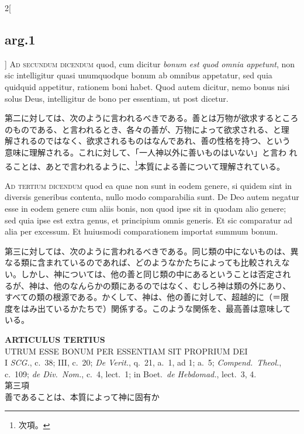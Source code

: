 \documentclass[paper=a4paper,fontsize=10pt,jafontsize=9pt,titlepage]{jlreq}
\begin{document}
\begin{paracol}{2}[\subsection{arg.1}]
{\scshape Ad secundum dicendum} quod, cum dicitur {\itshape bonum est quod omnia appetunt},
 non sic intelligitur quasi unumquodque bonum ab omnibus appetatur, sed
 quia quidquid appetitur, rationem boni habet. Quod autem dicitur, nemo
 bonus nisi solus Deus, intelligitur de bono per essentiam, ut post
 dicetur.

\switchcolumn

第二に対しては、次のように言われるべきである。善とは万物が欲求するところ
 のものである、と言われるとき、各々の善が、万物によって欲求される、と理
 解されるのではなく、欲求されるものはなんであれ、善の性格を持つ、という
 意味に理解される。これに対して、「一人神以外に善いものはいない」と言わ
 れることは、あとで言われるように、\footnote{次項。}本質による善について理解されている。

\switchcolumn*[\subsection{ad.3}]

{\scshape Ad tertium dicendum} quod ea quae non sunt in eodem genere, si quidem
 sint in diversis generibus contenta, nullo modo comparabilia sunt. De
 Deo autem negatur esse in eodem genere cum aliis bonis, non quod ipse
 sit in quodam alio genere; sed quia ipse est extra genus, et principium
 omnis generis. Et sic comparatur ad alia per excessum. Et huiusmodi
 comparationem importat summum bonum.

\switchcolumn

第三に対しては、次のように言われるべきである。同じ類の中にないものは、異
 なる類に含まれているのであれば、どのようなかたちによっても比較されえな
 い。しかし、神については、他の善と同じ類の中にあるということは否定され
 るが、神は、他のなんらかの類にあるのではなく、むしろ神は類の外にあり、
 すべての類の根源である。かくして、神は、他の善に対して、超越的に（＝限
 度をはみ出ているかたちで）関係する。このような関係を、最高善は意味して
 いる。

\end{paracol}
\newpage
{}

\begin{center}
 {\Large {\bfseries ARTICULUS TERTIUS}}\\
 {\large UTRUM ESSE BONUM PER ESSENTIAM SIT PROPRIUM DEI}\\
 {\footnotesize I {\itshape SCG.}, c.~38; III, c.~20; {\itshape De
 Verit.}, q.~21, a.~1, ad 1; a.~5; {\itshape Compend.~Theol.}, c.~109;
 {\itshape de Div.~Nom.}, c.~4, lect.~1; in Boet.~{\itshape de
 Hebdomad.}, lect.~3, 4.}\\
 {\Large 第三項\\善であることは、本質によって神に固有か }
\end{center}
\end{document}

